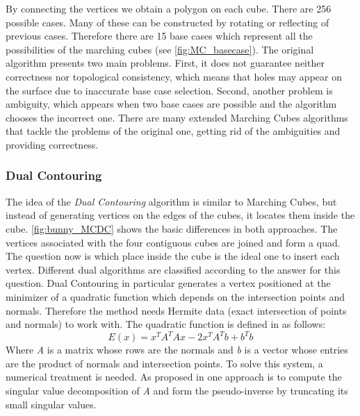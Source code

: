 By connecting the vertices we obtain a polygon on each cube. There are 256 possible cases. Many of these can be constructed by rotating or reflecting of previous cases.  Therefore  
there are 15 base cases which represent all the possibilities of the marching cubes (see \autoref{fig:MC_basecase}). 
The original algorithm presents two main problems. First, it does not guarantee neither
correctness nor topological consistency, which means that holes may appear on the surface due
to inaccurate base case selection. Second, another problem is ambiguity, which appears when two
base cases are possible and the algorithm chooses the incorrect one. There are many extended Marching Cubes
algorithms that tackle the problems of the original one, getting rid of the ambiguities and
providing correctness.  

\subsubsection{Dual Contouring}
The idea of the \emph{Dual Contouring} algorithm is similar to Marching Cubes, but instead of generating vertices on the
edges of the cubes, it locates them inside the cube. \autoref{fig:bunny_MCDC} shows the basic differences in both approaches.
The vertices associated with the four contiguous cubes are joined and form a quad. The question now is
which place inside the cube is the ideal one to insert each vertex. Different dual algorithms are classified 
according to the answer for this question. Dual Contouring in particular generates a vertex positioned at the minimizer of a
quadratic function which depends on the intersection points and normals. Therefore the method needs Hermite 
data (exact intersection of points and normals) to work with. 
The quadratic function is defined in \cite{Hermite2002} as follows:
\begin{equation*}
E(x)= x^TA^TAx-2x^TA^Tb+b^Tb
\end{equation*}
Where \textit{A} is a matrix whose rows are the normals and \textit{b} is a vector whose entries are the product of normals and intersection points. To solve this system, a numerical treatment is needed. As proposed in \cite{Hermite2002} one approach is to compute the
singular value decomposition of \textit{A} and form the pseudo-inverse by truncating its small singular values. 


